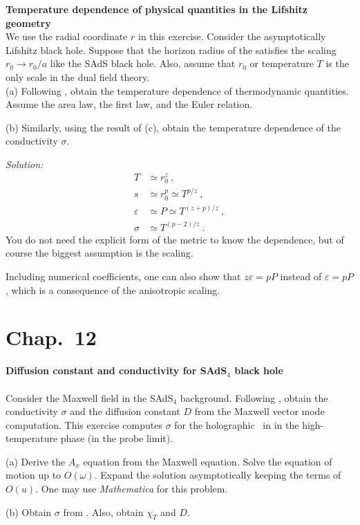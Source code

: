 \begin{prob}
\textbf{Temperature dependence of physical quantities in the Lifshitz geometry}\\
 We use the radial coordinate $r$ in this exercise. Consider the asymptotically Lifshitz black hole. Suppose that the horizon radius of the \bh satisfies the scaling $r_0 \rightarrow r_0/a$ like the SAdS black hole. Also, assume that $r_0$ or temperature $T$ is the only scale in the dual field theory. \\
 
\noindent
(a) Following , obtain the temperature dependence of thermodynamic quantities.  Assume the area law, the first law, and the Euler relation. 
 
\noindent
(b) Similarly, using the result of (c), obtain the temperature dependence of the conductivity $\sigma$.

\end{prob}

{\color{blue} 
\textit{Solution:}
\begin{align}
%
T &\simeq r_0^z~, \\
s &\simeq r_0^p \simeq T^{p/z}~, \\
\varepsilon &\simeq P \simeq T^{(z+p)/z}~, \\
\sigma &\simeq T^{(p-2)/z}~. 
%
\end{align}
You do not need the explicit form of the \bh metric to know the dependence, but of course the biggest assumption is the scaling.

Including numerical coefficients, one can also show that $z\varepsilon=pP$ instead of $\varepsilon=pP$, which is a consequence of the anisotropic scaling.
}



\section*{Chap.~12}%

\begin{prob}
\label{prob:SAdS4_diff}
\textbf{Diffusion constant and conductivity for SAdS$_4$ black hole} \\
 \\
Consider the Maxwell field in the SAdS$_4$ background. Following , obtain the conductivity $\sigma$ and the diffusion constant $D$ from the Maxwell vector mode computation. This exercise computes $\sigma$ for the holographic \SC\ in  in the high-temperature phase (in the probe limit).

\noindent
(a) Derive the $A_x$ equation from the Maxwell equation. Solve the equation of motion up to $O(\omega)$. Expand the solution asymptotically keeping the terms of $O(u)$.  One may use \textit{Mathematica} for this problem.

\noindent 
(b) Obtain $\sigma$ from . Also, obtain $\chi_T$ and $D$. \\

\end{prob}


